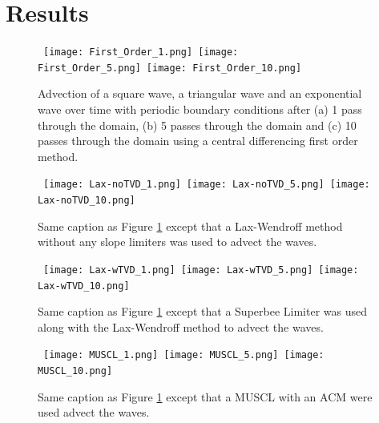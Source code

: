 \section{Results}
\label{results}
\begin{figure}[htbp]
\begin{center}
\mbox{
\texttt{[image: First\_Order\_1.png]}
\texttt{[image: First\_Order\_5.png]}
\texttt{[image: First\_Order\_10.png]}
} 
\mbox{  
}
\caption{Advection of a square wave, a triangular wave and an exponential wave over time with periodic boundary conditions after (a) 1 pass through the domain, (b) 5 passes through the domain and (c) 10 passes through the domain using a central differencing first order method.}
\label{First_Order}
\end{center}
\end{figure}

\begin{figure}[htbp]
\begin{center}
\mbox{
\texttt{[image: Lax-noTVD\_1.png]}
\texttt{[image: Lax-noTVD\_5.png]}
\texttt{[image: Lax-noTVD\_10.png]}
} 
\mbox{  
}
\caption{Same caption as Figure \ref{First_Order} except that a Lax-Wendroff method without any slope limiters was used to advect the waves.}
\label{Lax-noTVD}
\end{center}
\end{figure}

\begin{figure}[htbp]
\begin{center}
\mbox{
\texttt{[image: Lax-wTVD\_1.png]}
\texttt{[image: Lax-wTVD\_5.png]}
\texttt{[image: Lax-wTVD\_10.png]}
} 
\mbox{  
}
\caption{Same caption as Figure \ref{First_Order} except that a Superbee Limiter was used along with the Lax-Wendroff method to advect the waves.}
\label{Lax-wTVD}
\end{center}
\end{figure}

\begin{figure}[htbp]
\begin{center}
\mbox{
\texttt{[image: MUSCL\_1.png]}
\texttt{[image: MUSCL\_5.png]}
\texttt{[image: MUSCL\_10.png]}
} 
\mbox{  
}
\caption{Same caption as Figure \ref{First_Order} except that a MUSCL with an ACM were used advect the waves.}
\label{fig:MUSCL}
\end{center}
\end{figure}

